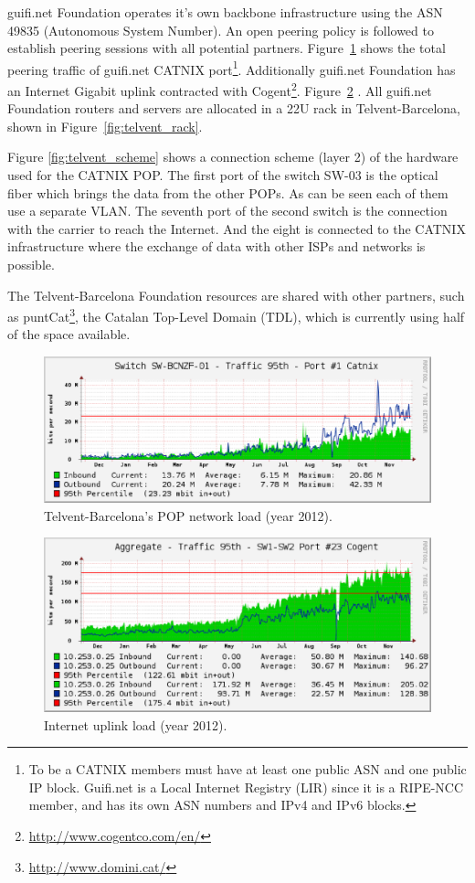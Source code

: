 guifi.net Foundation operates it's own backbone infrastructure using the ASN 49835 (Autonomous System Number). 
An open peering policy is followed to establish peering sessions with all potential partners. Figure~\ref{fig:catnix_net_load} shows the total peering traffic of guifi.net CATNIX port\footnote{To be a CATNIX members must have at least one public ASN and one public IP block. Guifi.net is a Local Internet Registry (LIR) since it is a RIPE-NCC member, and has its own ASN numbers and IPv4 and IPv6 blocks.}. Additionally guifi.net Foundation has an Internet Gigabit uplink contracted with Cogent\footnote{\url{http://www.cogentco.com/en/}}. Figure~\ref{fig:cogent_load} . All guifi.net Foundation routers and servers are allocated in a 22U rack in Telvent-Barcelona, shown in Figure~\ref{fig:telvent_rack}. 


Figure \ref{fig:telvent_scheme} shows a connection scheme (layer 2) of the hardware used for the CATNIX POP. 
The first port of the switch SW-03 is the optical fiber which brings the data from the other POPs. As can be seen each
of them use a separate VLAN. The seventh port of the second switch is the connection with the carrier to reach the Internet.
And the eight is connected to the CATNIX infrastructure where the exchange of data with other ISPs and networks is possible. 


The Telvent-Barcelona Foundation resources are shared with other partners, such as puntCat\footnote{\url{http://www.domini.cat/}}, the Catalan Top-Level Domain (TDL), which is currently using half of the space available.

\begin{figure}[htbp]
  \centering
  \includegraphics[scale=.65]{sect3/figures/catnix_network_load_year.eps} 
  \caption{Telvent-Barcelona's POP network load (year 2012).}
  \label{fig:catnix_net_load}
\end{figure}


\begin{figure}[htbp]
  \centering
  \includegraphics[scale=.65]{sect3/figures/cogent_network_load2.eps} 
  \caption{Internet uplink load (year 2012).}
  \label{fig:cogent_load}
\end{figure}



